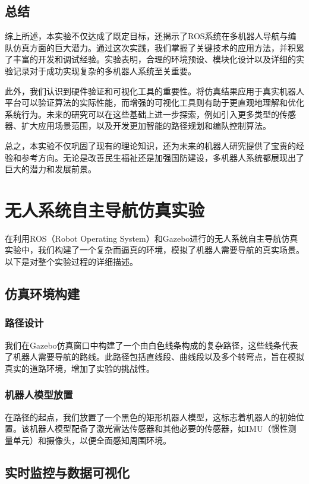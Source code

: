 \documentclass[journal,twoside,web]{ieeecolor}
\begin{document}
\subsection*{总结}
 
综上所述，本实验不仅达成了既定目标，还揭示了ROS系统在多机器人导航与编队仿真方面的巨大潜力。通过这次实践，我们掌握了关键技术的应用方法，并积累了丰富的开发和调试经验。实验表明，合理的环境预设、模块化设计以及详细的实验记录对于成功实现复杂的多机器人系统至关重要。
 
此外，我们认识到硬件验证和可视化工具的重要性。将仿真结果应用于真实机器人平台可以验证算法的实际性能，而增强的可视化工具则有助于更直观地理解和优化系统行为。未来的研究可以在这些基础上进一步探索，例如引入更多类型的传感器、扩大应用场景范围，以及开发更加智能的路径规划和编队控制算法。
 
总之，本实验不仅巩固了现有的理论知识，还为未来的机器人研究提供了宝贵的经验和参考方向。无论是改善民生福祉还是加强国防建设，多机器人系统都展现出了巨大的潜力和发展前景。
 

\section*{无人系统自主导航仿真实验}
 
在利用ROS（Robot Operating System）和Gazebo进行的无人系统自主导航仿真实验中，我们构建了一个复杂而逼真的环境，模拟了机器人需要导航的真实场景。以下是对整个实验过程的详细描述。
 
\subsection*{仿真环境构建}
\subsubsection*{路径设计}
我们在Gazebo仿真窗口中构建了一个由白色线条构成的复杂路径，这些线条代表了机器人需要导航的路线。此路径包括直线段、曲线段以及多个转弯点，旨在模拟真实的道路环境，增加了实验的挑战性。
 
\subsubsection*{机器人模型放置}
在路径的起点，我们放置了一个黑色的矩形机器人模型，这标志着机器人的初始位置。该机器人模型配备了激光雷达传感器和其他必要的传感器，如IMU（惯性测量单元）和摄像头，以便全面感知周围环境。
 
\subsection*{实时监控与数据可视化}
\end{document}
